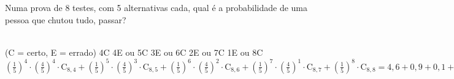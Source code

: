 \begin{ex}
Numa prova de 8 testes, com 5 alternativas cada, qual é a probabilidade de uma pessoa que chutou tudo, passar?
  \begin{sol}
    \phantom{A}\\
   (C = certo, E = errado)  \hspace{0,8cm}
   4C 4E ou  5C 3E ou 6C 2E ou 7C 1E ou 8C \\
   $(\frac{1}{5})^4\cdot(\frac{4}{5})^4\cdot\mathrm{C}_{8,4} +(\frac{1}{5})^5\cdot(\frac{4}{5})^3\cdot\mathrm{C}_{8,5} +(\frac{1}{5})^6\cdot(\frac{4}{5})^2\cdot\mathrm{C}_{8,6} +(\frac{1}{5})^7\cdot(\frac{4}{5})^1\cdot\mathrm{C}_{8,7} +(\frac{1}{5})^8\cdot\mathrm{C}_{8,8}=4,6+0,9+0,1+0,08+0,00037\approx5,6\%$
  \end{sol}
\end{ex}